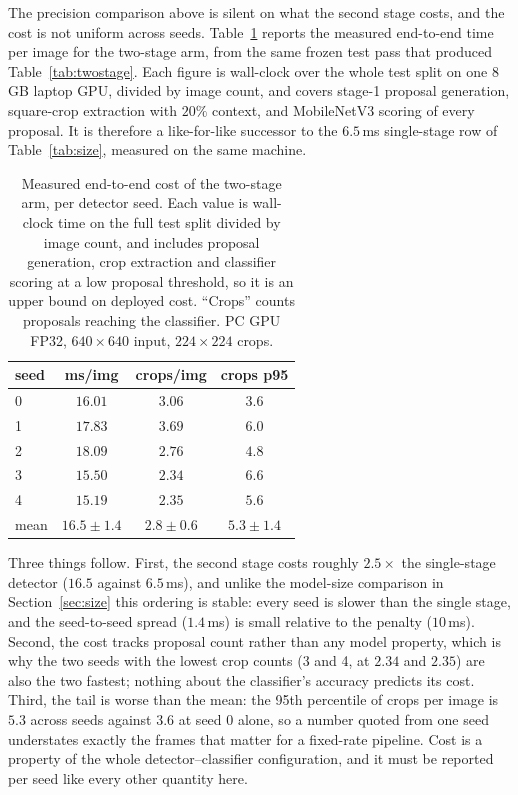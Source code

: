 The precision comparison above is silent on what the second stage costs, and the
cost is not uniform across seeds. Table~\ref{tab:cost} reports the measured
end-to-end time per image for the two-stage arm, from the same frozen test pass
that produced Table~\ref{tab:twostage}. Each figure is wall-clock over the whole
test split on one 8\,GB laptop GPU, divided by image count, and covers stage-1
proposal generation, square-crop extraction with $20\%$ context, and MobileNetV3
scoring of every proposal. It is therefore a like-for-like successor to the
$6.5$\,ms single-stage row of Table~\ref{tab:size}, measured on the same machine.

\begin{table}[t]
\centering
\caption{Measured end-to-end cost of the two-stage arm, per detector seed. Each
value is wall-clock time on the full test split divided by image count, and
includes proposal generation, crop extraction and classifier scoring at a
low proposal threshold, so it is an upper bound on deployed cost.
``Crops'' counts proposals reaching the classifier. PC GPU FP32,
$640\times640$ input, $224\times224$ crops.}
\label{tab:cost}
\scriptsize
\begin{tabular}{lccc}
\toprule
seed & ms/img & crops/img & crops p95 \\
\midrule
0 & $16.01$ & $3.06$ & $3.6$ \\
1 & $17.83$ & $3.69$ & $6.0$ \\
2 & $18.09$ & $2.76$ & $4.8$ \\
3 & $15.50$ & $2.34$ & $6.6$ \\
4 & $15.19$ & $2.35$ & $5.6$ \\
\midrule
mean & $16.5 \pm 1.4$ & $2.8 \pm 0.6$ & $5.3 \pm 1.4$ \\
\bottomrule
\end{tabular}
\end{table}

Three things follow. First, the second stage costs roughly $2.5\times$ the
single-stage detector ($16.5$ against $6.5$\,ms), and unlike the model-size
comparison in Section~\ref{sec:size} this ordering is stable: every seed is
slower than the single stage, and the seed-to-seed spread ($1.4$\,ms) is small
relative to the penalty ($10$\,ms). Second, the cost tracks proposal count rather
than any model property, which is why the two seeds with the lowest crop counts
(3 and 4, at $2.34$ and $2.35$) are also the two fastest; nothing about the
classifier's accuracy predicts its cost. Third, the tail is worse than the mean:
the 95th percentile of crops per image is $5.3$ across seeds against $3.6$ at
seed 0 alone, so a number quoted from one seed understates exactly the frames
that matter for a fixed-rate pipeline. Cost is a property of the whole
detector--classifier configuration, and it must be reported per seed like every
other quantity here.

